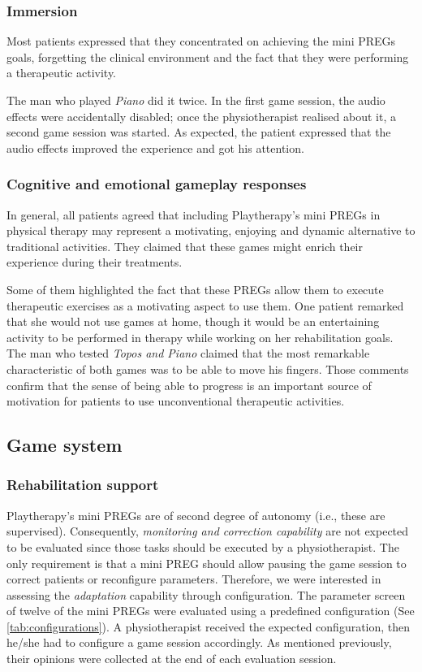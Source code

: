 \subsubsection*{Immersion}
Most patients expressed that they concentrated on achieving the mini \acp{PREG} goals, forgetting the clinical environment and the fact that they were performing a therapeutic activity.

The man who played \textit{Piano} did it twice. In the first game session, the audio effects were accidentally disabled; once the physiotherapist realised about it, a second game session was started. As expected, the patient expressed that the audio effects improved the experience and got his attention.

\subsubsection{Cognitive and emotional gameplay responses}
In general, all patients agreed that including Playtherapy's mini \acp{PREG} in physical therapy may represent a motivating, enjoying and dynamic alternative to traditional activities. They claimed that these games might enrich their experience during their treatments.

Some of them highlighted the fact that these \acp{PREG} allow them to execute therapeutic exercises as a motivating aspect to use them. One patient remarked that she would not use games at home, though it would be an entertaining activity to be performed in therapy while working on her rehabilitation goals. The man who tested \textit{Topos and Piano} claimed that the most remarkable characteristic of both games was to be able to move his fingers. Those comments confirm that the sense of being able to progress is an important source of motivation for patients to use unconventional therapeutic activities.

\subsection{Game system}
\subsubsection{Rehabilitation support}
Playtherapy's mini \acp{PREG} are of second degree of autonomy (i.e., these are supervised). Consequently, \textit{monitoring and correction capability} are not expected to be evaluated since those tasks should be executed by a physiotherapist. The only requirement is that a mini \ac{PREG} should allow pausing the game session to correct patients or reconfigure parameters.
Therefore, we were interested in assessing the \textit{adaptation} capability through configuration. The parameter screen of twelve of the mini \acp{PREG} were evaluated using a predefined configuration (See \autoref{tab:configurations}). A physiotherapist received the expected configuration, then he/she had to configure a game session accordingly. As mentioned previously, their opinions were collected at the end of each evaluation session.


